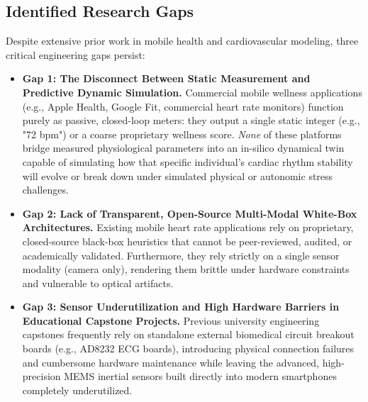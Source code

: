 \documentclass[11pt,a4paper]{article}
\begin{document}
\subsection{Identified Research Gaps}
Despite extensive prior work in mobile health and cardiovascular modeling, three critical engineering gaps persist:
\begin{itemize}[leftmargin=2.5em]
    \item \textbf{Gap 1: The Disconnect Between Static Measurement and Predictive Dynamic Simulation.}
    Commercial mobile wellness applications (e.g., Apple Health, Google Fit, commercial heart rate monitors) function purely as passive, closed-loop meters: they output a single static integer (e.g., "72 bpm") or a coarse proprietary wellness score. \textit{None} of these platforms bridge measured physiological parameters into an in-silico dynamical twin capable of simulating how that specific individual's cardiac rhythm stability will evolve or break down under simulated physical or autonomic stress challenges.
    
    \item \textbf{Gap 2: Lack of Transparent, Open-Source Multi-Modal White-Box Architectures.}
    Existing mobile heart rate applications rely on proprietary, closed-source black-box heuristics that cannot be peer-reviewed, audited, or academically validated. Furthermore, they rely strictly on a single sensor modality (camera only), rendering them brittle under hardware constraints and vulnerable to optical artifacts.
    
    \item \textbf{Gap 3: Sensor Underutilization and High Hardware Barriers in Educational Capstone Projects.}
    Previous university engineering capstones frequently rely on standalone external biomedical circuit breakout boards (e.g., AD8232 ECG boards), introducing physical connection failures and cumbersome hardware maintenance while leaving the advanced, high-precision MEMS inertial sensors built directly into modern smartphones completely underutilized.
\end{itemize}
\end{document}
